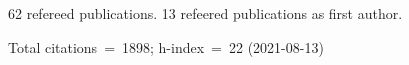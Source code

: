 62 refereed publications. 13 refeered publications as first author.

Total citations~=~1898; h-index~=~22 (2021-08-13)